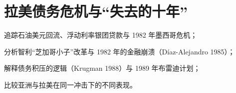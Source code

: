 \chapter{拉美债务危机与“失去的十年”}\label{ch:latamdebt}

\begin{chapterguide}
\begin{guidegoals}
\item 追踪石油美元回流、浮动利率银团贷款与 1982 年墨西哥危机；
\item 分析智利“芝加哥小子”改革与 1982 年的金融崩溃（Díaz-Alejandro 1985）；
\item 解释债务积压的逻辑（Krugman 1988）与 1989 年布雷迪计划；
\item 比较亚洲与拉美在同一冲击下的不同表现。
\end{guidegoals}
\end{chapterguide}

\chapterstub
